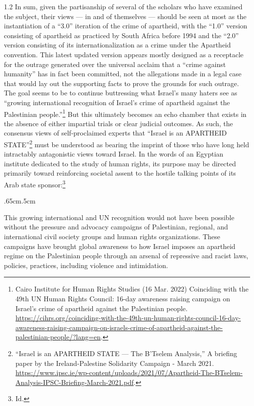 \documentclass[../unravbook.tex]{subfiles}
\begin{document}
\begin{spacing}{1.2}
In sum, given the partisanship of several of the scholars who have examined the subject, their views --- in and of themselves --- should be seen at most as the instantiation of a ``3.0'' iteration of the crime of apartheid, with the ``1.0'' version consisting of apartheid as practiced by South Africa before 1994 and the ``2.0'' version consisting of its internationalization as a crime under the Apartheid convention. This latest updated version appears mostly designed as a receptacle for the outrage generated over the universal acclaim that a \enquote{crime against humanity} has in fact been committed, not the allegations made in a legal case that would lay out the supporting facts to prove the grounds for such outrage. The goal seems to be to continue buttressing what Israel's many haters see as ``growing international recognition of Israel's crime of apartheid against the Palestinian people.''\footnote{Cairo Institute for Human Rights Studies (16 Mar. 2022) Coinciding with the 49th UN Human Rights Council: 16-day awareness raising campaign on Israel's crime of apartheid against the Palestinian people. \url{https://cihrs.org/coinciding-with-the-49th-un-human-rights-council-16-day-awareness-raising-campaign-on-israels-crime-of-apartheid-against-the-palestinian-people/?lang=en}.} But this ultimately becomes an echo chamber that exists in the absence of either impartial trials or clear judicial outcomes. As such, the consensus views of self-proclaimed experts that \enquote{Israel is an APARTHEID STATE}\footnote{\enquote{Israel is an APARTHEID STATE --- The B'Tselem Analysis,} A briefing paper by the Ireland-Palestine Solidarity Campaign - March 2021. \url{https://www.ipsc.ie/wp-content/uploads/2021/07/Apartheid-The-BTselem-Analysis-IPSC-Briefing-March-2021.pdf}.} must be understood as bearing the imprint of those who have long held intractably antagonistic views toward Israel. In the words of an Egyptian institute dedicated to the study of human rights, its purpose may be directed primarily toward reinforcing societal assent to the hostile talking points of its Arab state sponsor:\footnote{Id.}

\begin{adjustwidth}{.65cm}{.5cm}
   \begin{singlespace}
    This growing international and UN recognition would not have been possible without the pressure and advocacy campaigns of Palestinian, regional, and international civil society groups and human rights organizations. These campaigns have brought global awareness to how Israel imposes an apartheid regime on the Palestinian people through an arsenal of repressive and racist laws, policies, practices, including violence and intimidation.   
  \end{singlespace}
\end{adjustwidth}


\end{spacing}
\end{document}
